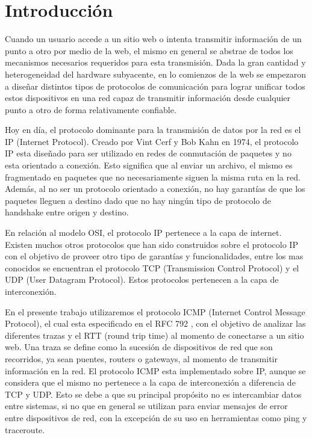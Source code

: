 \section{Introducción}

Cuando un usuario accede a un sitio web o intenta transmitir información de un punto a otro por medio de la web, el mismo en general se abstrae de todos los mecanismos necesarios requeridos para esta transmisión. Dada la gran cantidad y heterogeneidad del hardware subyacente, en lo comienzos de la web se empezaron a diseñar distintos tipos de protocolos de comunicación para lograr unificar todos estos dispositivos en una red capaz de transmitir información desde cualquier punto a otro de forma relativamente confiable.

Hoy en día, el protocolo dominante para la transmisión de datos por la red es el IP (Internet Protocol). Creado por Vint Cerf y Bob Kahn en 1974, el protocolo IP esta diseñado para ser utilizado en redes de conmutación de paquetes y no esta orientado a conexión. Esto significa que al enviar un archivo, el mismo es fragmentado en paquetes que no necesariamente siguen la misma ruta en la red. Además, al no ser un protocolo orientado a conexión, no hay garantías de que los paquetes lleguen a destino dado que no hay ningún tipo de protocolo de handshake entre origen y destino.

En relación al modelo OSI, el protocolo IP pertenece a la capa de internet. Existen muchos otros protocolos que han sido construidos sobre el protocolo IP con el objetivo de proveer otro tipo de garantías y funcionalidades, entre los mas conocidos se encuentran el protocolo TCP (Transmission Control Protocol) y el UDP (User Datagram Protocol). Estos protocolos pertenecen a la capa de interconexión.

En el presente trabajo utilizaremos el protocolo ICMP (Internet Control Message Protocol), el cual esta especificado en el RFC 792 \cite{RFC}, con el objetivo de analizar las diferentes trazas y el RTT (round trip time) al momento de conectarse a un sitio web. Una traza se define como la sucesión de dispositivos de red que son recorridos, ya sean puentes, routers o gateways, al momento de transmitir información en la red. El protocolo ICMP esta implementado sobre IP, aunque se considera que el mismo no pertenece a la capa de interconexión a diferencia de TCP y UDP. Esto se debe a que su principal propósito no es intercambiar datos entre sistemas, si no que en general se utilizan para enviar mensajes de error entre dispositivos de red, con la excepción de su uso en herramientas como ping y traceroute.

